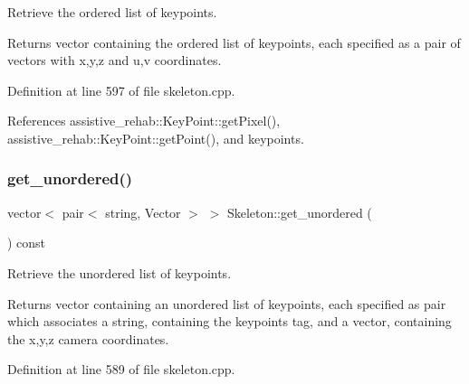 Retrieve the ordered list of keypoints. 

\begin{DoxyReturn}{Returns}
vector containing the ordered list of keypoints, each specified as a pair of vectors with x,y,z and u,v coordinates. 
\end{DoxyReturn}


Definition at line 597 of file skeleton.\+cpp.


\begin{DoxyCode}{0}

\end{DoxyCode}


References assistive\+\_\+rehab\+::\+Key\+Point\+::get\+Pixel(), assistive\+\_\+rehab\+::\+Key\+Point\+::get\+Point(), and keypoints.

\mbox{\label{classassistive__rehab_1_1Skeleton_a7b9f01b2b0f5450920335347c5861a2f}} 
\subsubsection{\texorpdfstring{get\_unordered()}{get\_unordered()}}
{\footnotesize\ttfamily vector$<$ pair$<$ string, Vector $>$ $>$ Skeleton\+::get\+\_\+unordered (\begin{DoxyParamCaption}{ }\end{DoxyParamCaption}) const\hspace{0.3cm}{\ttfamily [virtual]}}



Retrieve the unordered list of keypoints. 

\begin{DoxyReturn}{Returns}
vector containing an unordered list of keypoints, each specified as pair which associates a string, containing the keypoint\textquotesingle{}s tag, and a vector, containing the x,y,z camera coordinates. 
\end{DoxyReturn}


Definition at line 589 of file skeleton.\+cpp.


